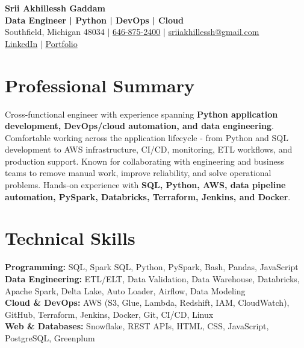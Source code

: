 \documentclass[letterpaper,10pt]{article}
\begin{document}
\fontsize{9.35pt}{10.45pt}\selectfont

\begin{center}
    {\LARGE \textbf{Srii Akhillessh Gaddam}} \\[-1pt]
    \textbf{Data Engineer | Python | DevOps | Cloud} \\[2pt]
    Southfield, Michigan 48034 $|$
    \href{tel:6468752400}{646-875-2400} $|$
    \href{mailto:sriiakhillessh@gmail.com}{sriiakhillessh@gmail.com} \\[1pt]
    \href{https://www.linkedin.com/in/srii-akhiilessh-gaddam-b48668191/}{LinkedIn} $|$
    \href{https://sriiakhillesshg.github.io/portfolio/}{Portfolio}
\end{center}
\vspace{-8pt}

\section{Professional Summary}
\small{Cross-functional engineer with experience spanning \textbf{Python application development, DevOps/cloud automation, and data engineering}. Comfortable working across the application lifecycle - from Python and SQL development to AWS infrastructure, CI/CD, monitoring, ETL workflows, and production support. Known for collaborating with engineering and business teams to remove manual work, improve reliability, and solve operational problems. Hands-on experience with \textbf{SQL, Python, AWS, data pipeline automation, PySpark, Databricks, Terraform, Jenkins, and Docker}.}

\section{Technical Skills}
\small{
\textbf{Programming:} SQL, Spark SQL, Python, PySpark, Bash, Pandas, JavaScript \\
\textbf{Data Engineering:} ETL/ELT, Data Validation, Data Warehouse, Databricks, Apache Spark, Delta Lake, Auto Loader, Airflow, Data Modeling \\
\textbf{Cloud \& DevOps:} AWS (S3, Glue, Lambda, Redshift, IAM, CloudWatch), GitHub, Terraform, Jenkins, Docker, Git, CI/CD, Linux \\
\textbf{Web \& Databases:} Snowflake, REST APIs, HTML, CSS, JavaScript, PostgreSQL, Greenplum
}
\end{document}
